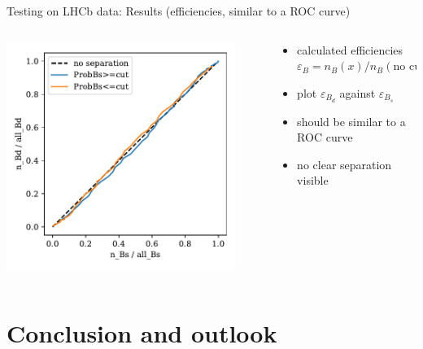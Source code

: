 \documentclass[aspectratio=1610, 10pt]{beamer}
\begin{document}
\begin{frame}{Testing on LHCb data: Results (efficiencies, similar to a ROC curve)}
  \begin{columns}
    \begin{column}{0.5\textwidth}
      \centering
      \includegraphics[width=0.9\textwidth]{images/data_roc.pdf}
    \end{column}
    \begin{column}{0.5\textwidth}
      \begin{itemize}
        \item calculated efficiencies $\varepsilon_B = n_B(x)/n_B(\text{no cut})$
        \item plot $\varepsilon_{B_d}$ against $\varepsilon_{B_s}$
        \item should be similar to a ROC curve
        \item no clear separation visible
      \end{itemize}
    \end{column}
  \end{columns}
\end{frame}

\section*{Conclusion and outlook}
\end{document}

